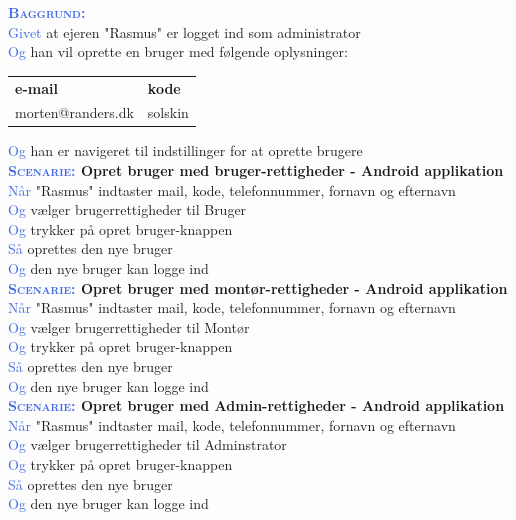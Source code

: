 \textcolor{RoyalBlue}{\textbf{\textsc{Baggrund:}}}\\
\textcolor{RoyalBlue}{Givet} at ejeren "Rasmus" er logget ind som administrator \\
\textcolor{RoyalBlue}{Og} han vil oprette en bruger med følgende oplysninger:\\
\begin{tabular}{| l | l |}
	\textbf{e-mail} & \textbf{kode} \\
	morten@randers.dk & solskin\\
\end{tabular}
\newline \newline
\textcolor{RoyalBlue}{Og} han er navigeret til indstillinger for at oprette brugere\\

\textbf{\textsc{\textcolor{RoyalBlue}{Scenarie:}} Opret bruger med bruger-rettigheder - Android applikation}\\
\textcolor{RoyalBlue}{Når} "Rasmus" indtaster mail, kode, telefonnummer, 
fornavn og efternavn \\
\textcolor{RoyalBlue}{Og} vælger brugerrettigheder til Bruger\\
\textcolor{RoyalBlue}{Og} trykker på opret bruger-knappen\\
\textcolor{RoyalBlue}{Så} oprettes den nye bruger\\
\textcolor{RoyalBlue}{Og} den nye bruger kan logge ind\\

\textbf{\textsc{\textcolor{RoyalBlue}{Scenarie:}} Opret bruger med montør-rettigheder - Android applikation}\\
\textcolor{RoyalBlue}{Når} "Rasmus" indtaster mail, kode, telefonnummer, 
fornavn og efternavn \\
\textcolor{RoyalBlue}{Og} vælger brugerrettigheder til Montør\\
\textcolor{RoyalBlue}{Og} trykker på opret bruger-knappen\\
\textcolor{RoyalBlue}{Så} oprettes den nye bruger\\
\textcolor{RoyalBlue}{Og} den nye bruger kan logge ind\\

\textbf{\textsc{\textcolor{RoyalBlue}{Scenarie:}} Opret bruger med Admin-rettigheder - Android applikation}\\
\textcolor{RoyalBlue}{Når} "Rasmus" indtaster mail, kode, telefonnummer, 
fornavn og efternavn \\
\textcolor{RoyalBlue}{Og} vælger brugerrettigheder til Adminstrator\\
\textcolor{RoyalBlue}{Og} trykker på opret bruger-knappen\\
\textcolor{RoyalBlue}{Så} oprettes den nye bruger\\
\textcolor{RoyalBlue}{Og} den nye bruger kan logge ind\\

